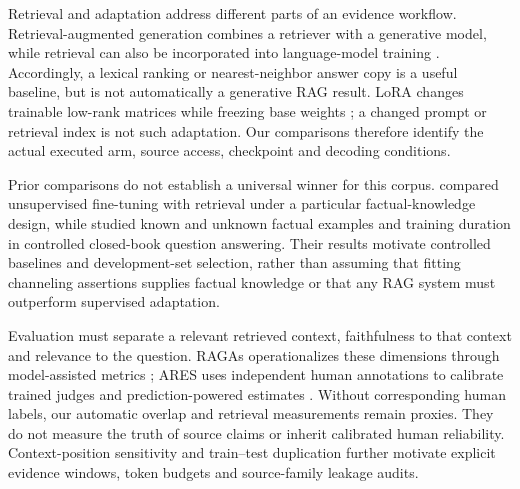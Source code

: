 Retrieval and adaptation address different parts of an evidence workflow. Retrieval-augmented generation combines a retriever with a generative model, while retrieval can also be incorporated into language-model training \citep{lewis2020rag,guu2020realm}. Accordingly, a lexical ranking or nearest-neighbor answer copy is a useful baseline, but is not automatically a generative RAG result. LoRA changes trainable low-rank matrices while freezing base weights \citep{hu2022lora}; a changed prompt or retrieval index is not such adaptation. Our comparisons therefore identify the actual executed arm, source access, checkpoint and decoding conditions.

Prior comparisons do not establish a universal winner for this corpus. \citet{ovadia2024finetuning} compared unsupervised fine-tuning with retrieval under a particular factual-knowledge design, while \citet{gekhman2024hallucinations} studied known and unknown factual examples and training duration in controlled closed-book question answering. Their results motivate controlled baselines and development-set selection, rather than assuming that fitting channeling assertions supplies factual knowledge or that any RAG system must outperform supervised adaptation.

Evaluation must separate a relevant retrieved context, faithfulness to that context and relevance to the question. RAGAs operationalizes these dimensions through model-assisted metrics \citep{es2024ragas}; ARES uses independent human annotations to calibrate trained judges and prediction-powered estimates \citep{saadfalcon2024ares}. Without corresponding human labels, our automatic overlap and retrieval measurements remain proxies. They do not measure the truth of source claims or inherit calibrated human reliability. Context-position sensitivity \citep{liu2024lostmiddle} and train--test duplication \citep{lee2022dedup} further motivate explicit evidence windows, token budgets and source-family leakage audits.
